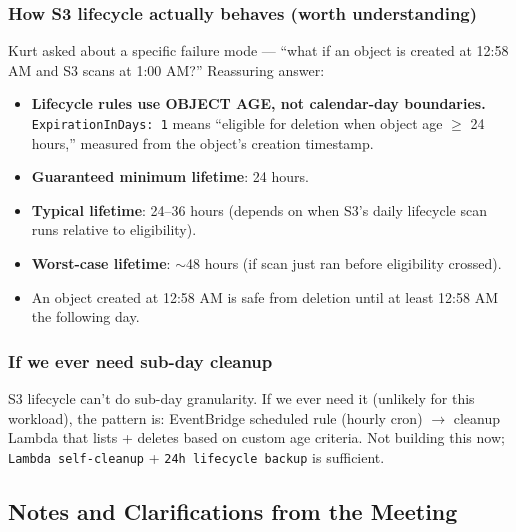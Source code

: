 \documentclass[11pt,letterpaper]{article}
\begin{document}
\subsubsection{How S3 lifecycle actually behaves (worth understanding)}
Kurt asked about a specific failure mode --- ``what if an object is created at 12:58 AM and S3 scans at 1:00 AM?'' Reassuring answer:

\begin{itemize}[nosep]
  \item \textbf{Lifecycle rules use OBJECT AGE, not calendar-day boundaries.} \texttt{ExpirationInDays: 1} means ``eligible for deletion when object age $\geq$ 24 hours,'' measured from the object's creation timestamp.
  \item \textbf{Guaranteed minimum lifetime}: 24 hours.
  \item \textbf{Typical lifetime}: 24--36 hours (depends on when S3's daily lifecycle scan runs relative to eligibility).
  \item \textbf{Worst-case lifetime}: $\sim$48 hours (if scan just ran before eligibility crossed).
  \item An object created at 12:58 AM is safe from deletion until at least 12:58 AM the following day.
\end{itemize}

\subsubsection{If we ever need sub-day cleanup}
S3 lifecycle can't do sub-day granularity. If we ever need it (unlikely for this workload), the pattern is: EventBridge scheduled rule (hourly cron) $\rightarrow$ cleanup Lambda that lists + deletes based on custom age criteria. Not building this now; \texttt{Lambda self-cleanup} + \texttt{24h lifecycle backup} is sufficient.

\subsection{Notes and Clarifications from the Meeting}
\label{sec:meeting-notes}
\end{document}
